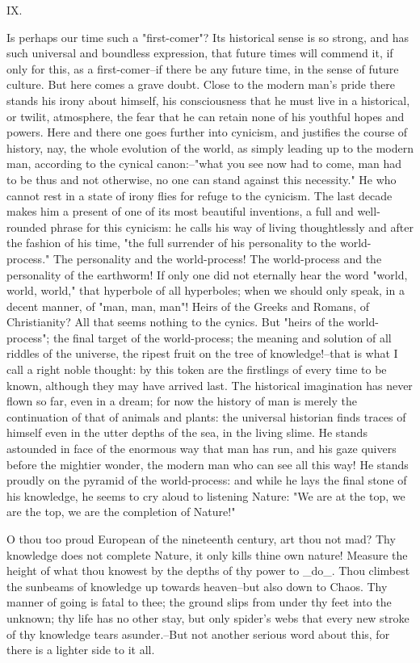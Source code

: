 IX.

Is perhaps our time such a "first-comer"? Its historical sense is so
strong, and has such universal and boundless expression, that future
times will commend it, if only for this, as a first-comer--if there
be any future time, in the sense of future culture. But here comes a
grave doubt. Close to the modern man's pride there stands his irony
about himself, his consciousness that he must live in a historical,
or twilit, atmosphere, the fear that he can retain none of his
youthful hopes and powers. Here and there one goes further into
cynicism, and justifies the course of history, nay, the whole
evolution of the world, as simply leading up to the modern man,
according to the cynical canon:--"what you see now had to come, man
had to be thus and not otherwise, no one can stand against this
necessity." He who cannot rest in a state of irony flies for refuge
to the cynicism. The last decade makes him a present of one of its
most beautiful inventions, a full and well-rounded phrase for this
cynicism: he calls his way of living thoughtlessly and after the
fashion of his time, "the full surrender of his personality to the
world-process." The personality and the world-process! The
world-process and the personality of the earthworm! If only one did
not eternally hear the word "world, world, world," that hyperbole of
all hyperboles; when we should only speak, in a decent manner, of
"man, man, man"! Heirs of the Greeks and Romans, of Christianity? All
that seems nothing to the cynics. But "heirs of the world-process";
the final target of the world-process; the meaning and solution of
all riddles of the universe, the ripest fruit on the tree of
knowledge!--that is what I call a right noble thought: by this token
are the firstlings of every time to be known, although they may have
arrived last. The historical imagination has never flown so far, even
in a dream; for now the history of man is merely the continuation of
that of animals and plants: the universal historian finds traces of
himself even in the utter depths of the sea, in the living slime. He
stands astounded in face of the enormous way that man has run, and
his gaze quivers before the mightier wonder, the modern man who can
see all this way! He stands proudly on the pyramid of the
world-process: and while he lays the final stone of his knowledge, he
seems to cry aloud to listening Nature: "We are at the top, we are
the top, we are the completion of Nature!"

O thou too proud European of the nineteenth century, art thou not
mad? Thy knowledge does not complete Nature, it only kills thine own
nature! Measure the height of what thou knowest by the depths of thy
power to _do_. Thou climbest the sunbeams of knowledge up towards
heaven--but also down to Chaos. Thy manner of going is fatal to thee;
the ground slips from under thy feet into the unknown; thy life has
no other stay, but only spider's webs that every new stroke of thy
knowledge tears asunder.--But not another serious word about this,
for there is a lighter side to it all.

